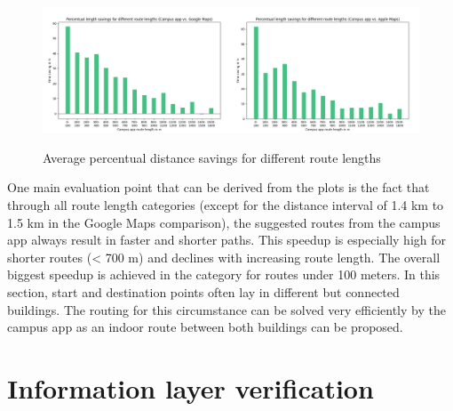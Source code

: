 \begin{figure}[H]
	\centering
	\includegraphics[width=1.0\textwidth]{images/length_differences.png}\\
	\caption{Average percentual distance savings for different route lengths}
\end{figure}

One main evaluation point that can be derived from the plots is the fact that through all route length categories (except for the distance interval of 1.4 km to 1.5 km in the Google Maps comparison), the suggested routes from the campus app always result in faster and shorter paths. This speedup is especially high for shorter routes (< 700 m) and declines with increasing route length. The overall biggest speedup is achieved in the category for routes under 100 meters. In this section, start and destination points often lay in different but connected buildings. The routing for this circumstance can be solved very efficiently by the campus app as an indoor route between both buildings can be proposed.

\section{Information layer verification}
